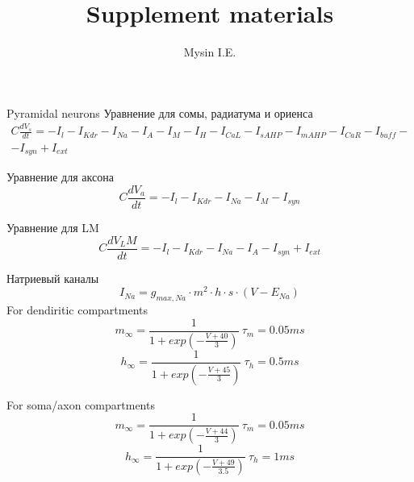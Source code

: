 \documentclass[12pt]{article}
\title{Supplement materials}
\date{}
\author{Mysin I.E.}
\begin{document}
	\maketitle
	Pyramidal neurons
	\newline
	Уравнение для сомы, радиатума и ориенса
	\begin{eqnarray}
C\frac{dV_s}{dt} = -I_l - I_{Kdr}-I_{Na} -I_A - I_M-I_H-I_{CaL} - I_{sAHP}-I_{mAHP} -I_{CaR}-I_{buff}-\nonumber \\
-I_{syn}+I_{ext}
	\end{eqnarray}
\newline

Уравнение для аксона
\newline
	\begin{equation}
	C\frac{dV_a}{dt} = -I_l - I_{Kdr}-I_{Na}- I_M - I_{syn}
    \end{equation}
\newline

Уравнение для LM
\newline
\begin{equation}
C\frac{dV_LM}{dt} = -I_l - I_{Kdr}-I_{Na}- I_A - I_{syn} + I_{ext}
\end{equation}
\newline

Натриевый каналы
\newline
\begin{equation}
I_{Na} = g_{max, Na} \cdot m^2 \cdot h\cdot s \cdot(V - E_{Na})
\end{equation}
\newline
For dendiritic compartments
\newline
\begin{equation}
m_{\infty} = \frac{1}{1 + exp(-\frac{V + 40}{3})} \ 
\tau_m = 0.05 ms
\end{equation}
\newline
\begin{equation}
h_{\infty} = \frac{1}{1 + exp(-\frac{V + 45}{3})} \ 
\tau_h = 0.5 ms
\end{equation}
\newline

For soma/axon compartments
\begin{equation}
m_{\infty} = \frac{1}{1 + exp(-\frac{V + 44}{3})} \ 
\tau_m = 0.05 ms
\end{equation}
\newline
\begin{equation}
h_{\infty} = \frac{1}{1 + exp(-\frac{V + 49}{3.5})} \ 
\tau_h = 1 ms
\end{equation}
\newline
\end{document}
